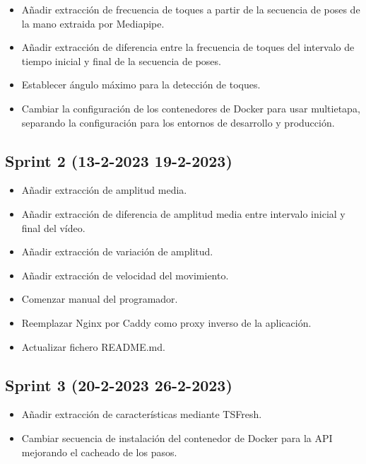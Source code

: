 \begin{itemize}
    \item Añadir extracción de frecuencia de toques a partir de la secuencia
          de poses de la mano extraida por Mediapipe.
    \item Añadir extracción de diferencia entre la frecuencia de toques del
          intervalo de tiempo inicial y final de la secuencia de poses.
    \item Establecer ángulo máximo para la detección de toques.
    \item Cambiar la configuración de los contenedores de Docker para usar
          multietapa, separando la configuración para los entornos de desarrollo y
          producción.
\end{itemize}


\subsection{Sprint 2 (13-2-2023  19-2-2023)}

\begin{itemize}
    \item Añadir extracción de amplitud media.
    \item Añadir extracción de diferencia de amplitud media entre intervalo
          inicial y final del vídeo.
    \item Añadir extracción de variación de amplitud.
    \item Añadir extracción de velocidad del movimiento.
    \item Comenzar manual del programador.
    \item Reemplazar Nginx por Caddy como proxy inverso de la aplicación.
    \item Actualizar fichero README.md.
\end{itemize}

\subsection{Sprint 3 (20-2-2023  26-2-2023)}

\begin{itemize}
    \item Añadir extracción de características mediante TSFresh.
    \item Cambiar secuencia de instalación del contenedor de Docker para la
          API mejorando el cacheado de los pasos.
\end{itemize}

